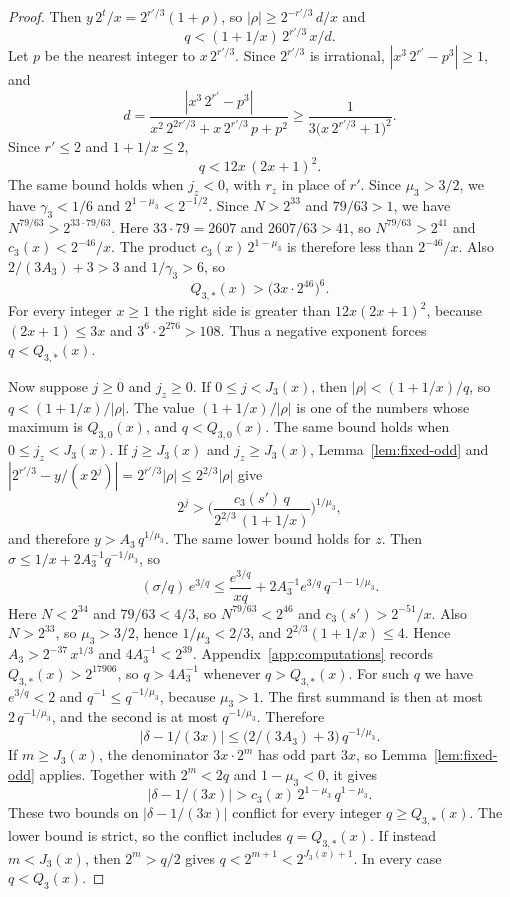 \documentclass[11pt]{article}
\begin{document}
\begin{proof}
Then $y\, 2^{t}/x = 2^{r'/3}(1+\rho)$, so $|\rho| \ge 2^{-r'/3}\, d/x$ and
\[
q < (1+1/x)\, 2^{r'/3}\, x/d.
\]
Let $p$ be the nearest integer to $x\, 2^{r'/3}$.
Since $2^{r'/3}$ is irrational, $|x^3\, 2^{r'} - p^3| \ge 1$, and
\[
d = \frac{|x^3\, 2^{r'} - p^3|}{x^2\, 2^{2r'/3} + x\, 2^{r'/3}\, p + p^2} \ge \frac{1}{3\bigl(x\, 2^{r'/3} + 1\bigr)^2}.
\]
Since $r' \le 2$ and $1 + 1/x \le 2$,
\[
q < 12x\, (2x + 1)^2.
\]
The same bound holds when $j_z < 0$, with $r_z$ in place of $r'$.
Since $\mu_3 > 3/2$, we have $\gamma_3 < 1/6$ and $2^{1 - \mu_3} < 2^{-1/2}$.
Since $N > 2^{33}$ and $79/63 > 1$, we have $N^{79/63} > 2^{33 \cdot 79/63}$.
Here $33 \cdot 79 = 2607$ and $2607/63 > 41$, so $N^{79/63} > 2^{41}$ and $c_3(x) < 2^{-46}/x$.
The product $c_3(x)\, 2^{1-\mu_3}$ is therefore less than $2^{-46}/x$.
Also $2/(3A_3) + 3 > 3$ and $1/\gamma_3 > 6$, so
\[
Q_{3,*}(x) > \bigl(3x \cdot 2^{46}\bigr)^{6}.
\]
For every integer $x \ge 1$ the right side is greater than $12x(2x + 1)^2$, because $(2x + 1) \le 3x$ and $3^6 \cdot 2^{276} > 108$.
Thus a negative exponent forces $q < Q_{3,*}(x)$.

Now suppose $j \ge 0$ and $j_z \ge 0$.
If $0 \le j < J_3(x)$, then $|\rho| < (1+1/x)/q$, so $q < (1+1/x)/|\rho|$.
The value $(1+1/x)/|\rho|$ is one of the numbers whose maximum is $Q_{3,0}(x)$, and $q < Q_{3,0}(x)$.
The same bound holds when $0 \le j_z < J_3(x)$.
If $j \ge J_3(x)$ and $j_z \ge J_3(x)$, Lemma~\ref{lem:fixed-odd} and $|2^{r'/3} - y/(x\, 2^j)| = 2^{r'/3}|\rho| \le 2^{2/3}|\rho|$ give
\[
2^{j} > \Biggl( \frac{c_3(s')\, q}{2^{2/3}\,(1+1/x)} \Biggr)^{1/\mu_3},
\]
and therefore $y > A_3\, q^{1/\mu_3}$.
The same lower bound holds for $z$.
Then $\sigma \le 1/x + 2 A_3^{-1} q^{-1/\mu_3}$, so
\[
(\sigma/q)\, e^{3/q} \le \frac{e^{3/q}}{xq} + 2 A_3^{-1} e^{3/q}\, q^{-1-1/\mu_3}.
\]
Here $N < 2^{34}$ and $79/63 < 4/3$, so $N^{79/63} < 2^{46}$ and $c_3(s') > 2^{-51}/x$.
Also $N > 2^{33}$, so $\mu_3 > 3/2$, hence $1/\mu_3 < 2/3$, and $2^{2/3}(1+1/x) \le 4$.
Hence $A_3 > 2^{-37}\, x^{1/3}$ and $4A_3^{-1} < 2^{39}$.
Appendix~\ref{app:computations} records $Q_{3,*}(x) > 2^{17906}$, so $q > 4A_3^{-1}$ whenever $q > Q_{3,*}(x)$.
For such $q$ we have $e^{3/q} < 2$ and $q^{-1} \le q^{-1/\mu_3}$, because $\mu_3 > 1$.
The first summand is then at most $2\, q^{-1/\mu_3}$, and the second is at most $q^{-1/\mu_3}$.
Therefore
\[
\bigl|\delta - 1/(3x)\bigr| \le \bigl(2/(3A_3) + 3\bigr)\, q^{-1/\mu_3}.
\]
If $m \ge J_3(x)$, the denominator $3x \cdot 2^m$ has odd part $3x$, so Lemma~\ref{lem:fixed-odd} applies.
Together with $2^m < 2q$ and $1 - \mu_3 < 0$, it gives
\[
\bigl|\delta - 1/(3x)\bigr| > c_3(x)\, 2^{1-\mu_3}\, q^{1-\mu_3}.
\]
These two bounds on $|\delta - 1/(3x)|$ conflict for every integer $q \ge Q_{3,*}(x)$.
The lower bound is strict, so the conflict includes $q = Q_{3,*}(x)$.
If instead $m < J_3(x)$, then $2^m > q/2$ gives $q < 2^{m+1} < 2^{J_3(x)+1}$.
In every case $q < Q_3(x)$.
\end{proof}
\end{document}
